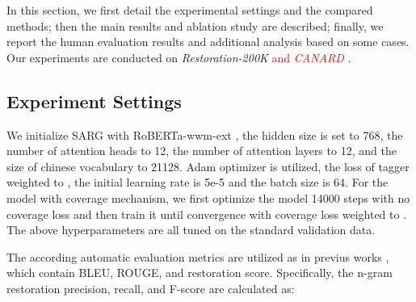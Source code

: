 In this section, we first detail the experimental settings and the compared methods; then the main results and ablation study are described; finally, we report the human evaluation results and additional analysis based on some cases. Our experiments are conducted on \textit{Restoration-200K} \cite{pan2019improving} \textcolor{red}{and \textit{CANARD} \cite{elgohary-etal-2019-unpack}}. 




\subsection{Experiment Settings}\label{setting}
We initialize  SARG with RoBERTa-wwm-ext \cite{chinese-bert-wwm}, the hidden size is set to 768, the number of attention heads to 12, the number of attention layers to 12, and the size of chinese vocabulary to 21128. Adam optimizer is utilized, the loss of tagger weighted to , the initial learning rate is 5e-5 and the batch size is 64. For the model with coverage mechanism, we first optimize the model 14000 steps with no coverage loss and then train it until convergence with coverage loss weighted to . The above hyperparameters are all tuned on the standard validation data.

The according automatic evaluation metrics are utilized as in previus works \cite{pan2019improving, elgohary-etal-2019-unpack}, which contain BLEU, ROUGE, and restoration score. Specifically, the n-gram restoration precision, recall, and F-score are calculated as:
\begin{linenomath}

\end{linenomath}


